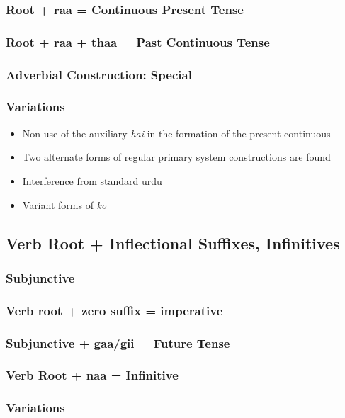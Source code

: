 \documentclass[a4paper]{article}
\begin{document}
\subsubsection{Root + raa = Continuous Present Tense}
\subsubsection{Root + raa + thaa = Past Continuous Tense}
\subsubsection{Adverbial Construction: Special}

\subsubsection{Variations}

\begin{itemize}
\item
Non-use of the auxiliary \textit{hai} in the formation of the present continuous
\item
Two alternate forms of regular primary system constructions are found
\item
Interference from standard urdu
\item
Variant forms of \textit{ko}
\end{itemize}

\subsection{Verb Root + Inflectional Suffixes, Infinitives}

\subsubsection{Subjunctive}
\subsubsection{Verb root + zero suffix = imperative}
\subsubsection{Subjunctive + gaa/gii = Future Tense}
\subsubsection{Verb Root + naa = Infinitive}

\subsubsection{Variations}
\end{document}
